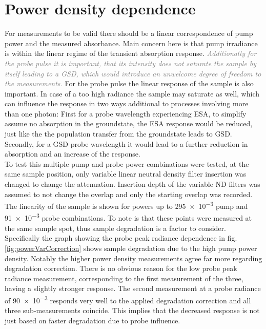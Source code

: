\documentclass[twoside,openright]{scrreprt}
\begin{document}
\section{Power density dependence}\label{sec:powerVar}
For measurements to be valid there should be a linear correspondence of pump power and the measured absorbance. Main concern here is that pump irradiance is within the linear regime of the transient absorption response. \textit{\textcolor{gray}{Additionally for the probe pulse it is important, that its intensity does not saturate the sample by itself leading to a GSD, which would introduce an unwelcome degree of freedom to the measurements.}} For the probe pulse the linear response of the sample is also important. In case of a too high radiance the sample may saturate as well, which can influence the response in two ways additional to processes involving more than one photon: First for a probe wavelength experiencing ESA, to simplify assume no absorption in the groundstate, the ESA response would be reduced, just like the the population transfer from the groundstate leads to GSD. Secondly, for a GSD probe wavelength it would lead to a further reduction in absorption  and an increase of the response.\\
To test this multiple pump and probe power combinations were tested, at the same sample position, only variable linear neutral density filter insertion was changed to change the attenuation. Insertion depth of the variable ND filters was assumed to not change the overlap and only the starting overlap was recorded. The linearity of the sample is shown for powers up to \SI{295e-3}{\radExp} pump and \SI{91e-3}{\radExp} probe combinations. To note is that these points were measured at the same sample spot, thus sample degradation is a factor to consider. Specifically the graph showing the probe peak radiance dependence in fig. \ref{fig:powerVarCorrection} shows sample degradation due to the high pump power density. Notably the higher power density measurements agree far more regarding degradation correction. There is no obvious reason for the low probe peak radiance measurement, corresponding to the first measurement of the three, having a slightly stronger response. The second measurement at a probe radiance of \SI{90e-3}{\radExp} responds very well to the applied degradation correction and all three sub-measurements coincide. This implies that the decreased response is not just based on faster degradation due to probe influence.
\end{document}
